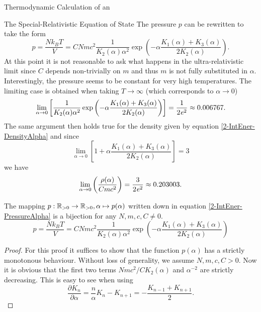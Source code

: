 \begin{section}{Thermodynamic Calculation of an }
\begin{subsection}{The Special-Relativistic Equation of State}
The pressure $p$ can be rewritten to take the form
\begin{equation}
	p = \frac{Nk_BT}{V} = CNmc^2\frac{1}{K_2(\alpha)\alpha^2}\exp\left(-\alpha\frac{K_1(\alpha)+K_3(\alpha)}{2K_2(\alpha)}\right).
	\label{2-IntEner-PressureAlpha}
\end{equation}
At this point it is not reasonable to ask what happens in the ultra-relativistic limit since $C$ depends non-trivially on $m$ and thus $m$ is not fully substituted in $\alpha$.\\
Interestingly, the pressure seems to be constant for very high temperatures.
The limiting case is obtained when taking $T\rightarrow\infty$ (which corresponds to $\alpha\rightarrow0$)
\begin{equation}
	\lim\limits_{\alpha\to0}\left[\frac{1}{K_2(\alpha)\alpha^2}\exp\left(-\alpha\frac{K_1(\alpha)+K_3(\alpha)}{2K_2(\alpha)}\right)\right] = \frac{1}{2\mathit{e}^2} \approx 0.006767.
	\label{2-IntEner-PressureAlpha-Limit}
\end{equation}
The same argument then holds true for the density given by equation \eqref{2-IntEner-DensityAlpha} and since 
\begin{equation}
	\lim\limits_{\alpha\to0}\left[1+\alpha\frac{K_1(\alpha)+K_3(\alpha)}{2K_2(\alpha)}\right] = 3
\end{equation}
we have
\begin{equation}
	\lim\limits_{\alpha\to0}\left(\frac{\rho(\alpha)}{Cmc^2}\right) = \frac{3}{2\mathit{e}^2} \approx 0.203003.
\end{equation}
%
%
\begin{theorem}
	The mapping $p:\mathbb{R}_{>0}\rightarrow \mathbb{R}_{>0},\alpha\mapsto p(\alpha)$ written down in equation \eqref{2-IntEner-PressureAlpha} is a bijection for any $N,m,c,C\neq0$.
	\begin{equation}
		p = \frac{Nk_BT}{V} = CNmc^2\frac{1}{K_2(\alpha)\alpha^2}\exp\left(-\alpha\frac{K_1(\alpha)+K_3(\alpha)}{2K_2(\alpha)}\right)
	\end{equation}
\end{theorem}
\begin{proof}
	For this proof it suffices to show that the function $p(\alpha)$ has a strictly monotonous behaviour.
	Without loss of generality, we assume $N,m,c,C>0$.
	Now it is obvious that the first two terms $Nmc^2/CK_2(\alpha)$ and $\alpha^{-2}$ are strictly decreasing.
	This is easy to see when using \cite{abramowitzPocketbookMathematicalFunctions1984}
	\begin{equation}
		\frac{\partial K_n}{\partial\alpha} = \frac{n}{\alpha}K_n-K_{n+1} = -\frac{K_{n-1}+K_{n+1}}{2}.

\end{equation}
\end{proof}
\end{subsection}
\end{section}
